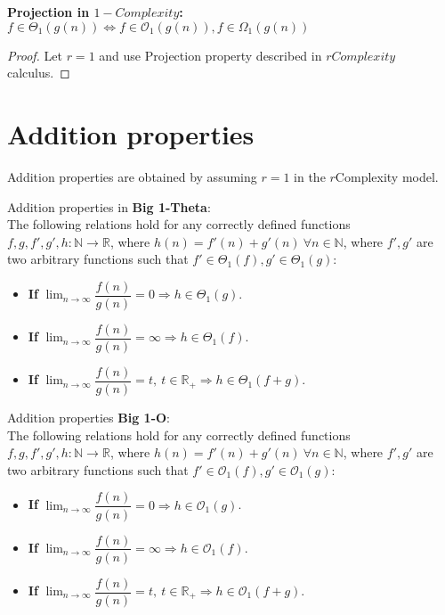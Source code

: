 \begin{theorem} 
  \textbf{Projection in $1-Complexity$:}  \\  $ f \in \Theta_{1}(g(n)) \Leftrightarrow f \in \mathcal{O}_{1}(g(n)), f \in \Omega_{1}(g(n)) $
\end{theorem} 
\begin{proof} 
   Let $r = 1$ and use Projection property described in $rComplexity$ calculus.
\end{proof} 



\section{Addition properties}
Addition properties are obtained by assuming $r = 1$ in the $r$Complexity model.
\begin{theorem} 
Addition properties in \textbf{Big 1-Theta}:  \\
The following relations hold for any correctly defined functions $f, g, f', g', h:\mathbb{N}\longrightarrow\mathbb{R}$, where $ h(n) = f'(n) + g'(n)\  \forall n \in  \mathbb{N} $, where $f',g'$ are two arbitrary functions such that $ f' \in \Theta_{1}(f),  g' \in \Theta_{1}(g) $:  
  \begin{itemize}
  \item \textbf{If} $ \lim_{n\to\infty} \dfrac{f(n)}{g(n)} = 0 \Rightarrow  h \in \Theta_{1}(g) $. 
  \item \textbf{If} $ \lim_{n\to\infty} \dfrac{f(n)}{g(n)} = \infty \Rightarrow  h \in \Theta_{1}(f) $. 
  \item \textbf{If} $ \lim_{n\to\infty} \dfrac{f(n)}{g(n)} = t, \ t \in \mathbb{R}_{+} \Rightarrow  h \in \Theta_{1} \left( f + g \right) $. 
    \end{itemize}
\end{theorem} 

\begin{theorem} 
Addition properties \textbf{Big 1-O}: \\
The following relations hold for any correctly defined functions $f, g, f', g', h:\mathbb{N}\longrightarrow\mathbb{R}$, where $ h(n) = f'(n) + g'(n)\  \forall n \in \mathbb{N} $, where $f',g'$ are two arbitrary functions such that $ f' \in \mathcal{O}_{1}(f),  g' \in \mathcal{O}_{1}(g) $:  
  \begin{itemize}
  \item \textbf{If} $ \lim_{n\to\infty} \dfrac{f(n)}{g(n)} = 0 \Rightarrow  h \in \mathcal{O}_{1}(g) $. 
  \item \textbf{If} $ \lim_{n\to\infty} \dfrac{f(n)}{g(n)} = \infty \Rightarrow  h \in \mathcal{O}_{1}(f) $. 
  \item \textbf{If} $ \lim_{n\to\infty} \dfrac{f(n)}{g(n)} = t, \ t \in \mathbb{R}_{+} \Rightarrow  h \in \mathcal{O}_{1} \left( f + g \right) $.
  \end{itemize}
\end{theorem} 


